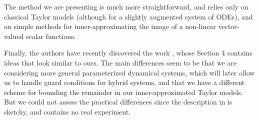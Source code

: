 \documentclass{sig-alternate-05-2015} %
\newcommand\ForAuthors[1]%
 {\par\smallskip                     %
  \begin{center}%
   \fbox%
   {\parbox{0.9\linewidth}%
    {\raggedright\sc--- #1}%
   }%
  \end{center}%
  \par\smallskip                     %
 }
\begin{document}
The method we are presenting is much more straightforward, and relies only on classical
Taylor models (although for a slightly augmented system of ODEs), and on simple methods
for inner-approximating the image of a non-linear vector-valued scalar functions. 

Finally, the authors have recently discovered the work \cite{Gold06}, whose Section 4 contains
ideas that look similar to ours. The main differences seem to be that we are considering more
general parameterized dynamical systems, which will later allow us to handle guard conditions for hybrid systems, 
and that we have a different scheme for bounding
the remainder in our inner-approximated Taylor models. But we could not assess the practical
differences since the description in \cite{Gold06} is sketchy, and contains no real experiment. 






\end{document}
